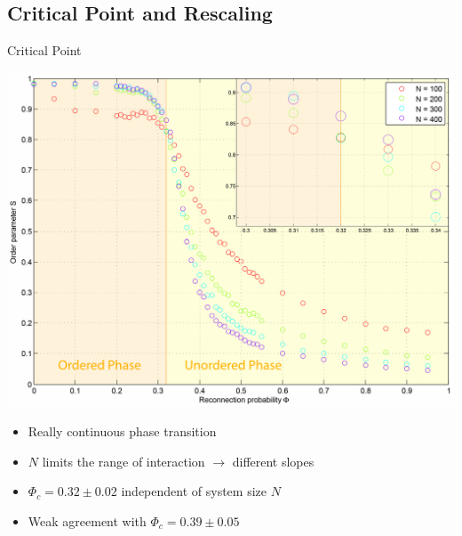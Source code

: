 \documentclass[xcolor=x11names,compress]{beamer}
\renewcommand{\(}{\begin{columns}}
\renewcommand{\)}{\end{columns}}
\newcommand{\<}[1]{\begin{column}{#1}}
\renewcommand{\>}{\end{column}}
\begin{document}

\subsection{Critical Point and Rescaling}

\begin{frame}{Critical Point}

\begin{center}
\includegraphics[scale=0.35]{Graphics/SvsPHI_combined.pdf}
\end{center}

\begin{itemize}
\item Really continuous phase transition
\item $N$ limits the range of interaction $\rightarrow$ different slopes
\item $\Phi_c = 0.32 \pm 0.02$ independent of system size $N$
\item Weak agreement with $\Phi_c = 0.39 \pm 0.05$
\end{itemize}

\end{frame}


\end{document}
